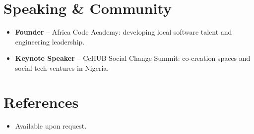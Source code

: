 \documentclass[11pt,a4paper,sans]{moderncv}
\begin{document}

\section{Speaking \& Community}
\vspace{1pt}
\begin{itemize}
\item{\textbf{Founder} -- Africa Code Academy: developing local software talent and engineering leadership.}
\item{\textbf{Keynote Speaker} -- CcHUB Social Change Summit: co-creation spaces and social-tech ventures in Nigeria.}
\end{itemize}


\section{References}
\vspace{1pt}
\begin{itemize}
\item{Available upon request.}
\end{itemize}
\end{document}

